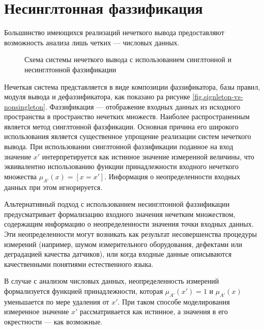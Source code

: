 \section{Несинглтонная фаззификация}

Большинство имеющихся реализаций нечеткого вывода предоставляют возможность анализа лишь четких --- числовых данных.

\begin{figure}[ht]
	\caption{Схема системы нечеткого вывода с использованием синглтонной и несинглтонной фаззификации}
	\label{fig:singleton-vs-nonsingleton}
\end{figure}

Нечеткая система представляется в виде композиции фаззификатора, базы правил, модуля вывода и дефаззификатора, как показано ра рисунке \cref{fig.signleton-vs-nonsingleton}. Фаззификация --- отображение входных данных из исходного пространства в пространство нечетких множеств. Наиболее распространенным является метод синглтонной фаззфикации. Основная причина его широкого использования является существенное упрощение реализации систем нечеткого вывода. При использовании синглтонной фаззификации поданное на вход значение $x'$ интерпретируется как истинное значение измеренной величины, что эквивалентно использованию функции принадлежности входного нечеткого множества $\mu_{A'}(x) = \left[x = x'\right]$. Информация о неопределенности входных данных при этом игнорируется.

Альтернативный подход с использованием несинглтонной фаззификации предусматривает формализацию входного значения нечетким множеством, содержащим информацию о неопределенности значения точки входных данных. Эти неопределенности могут возникать как результат несовершенства процедуры измерений (например, шумом измерительного оборудования, дефектами или деградацией качества датчиков), или когда входные данные описываются качественными понятиями естественного языка.

В случае с анализом числовых данных, неопределенность измерений формализуется функцией принадлежности, которая $\mu_{A'}(x') = 1$ и $\mu_{A'}(x)$ уменьшается по мере удаления от $x'$. При таком способе моделирования измеренное значение $x'$ рассматривается как истинное, а значения в его окрестности --- как возможные.

